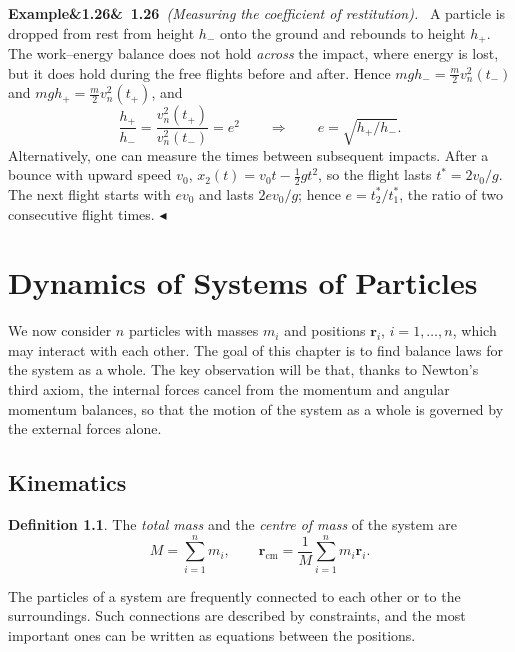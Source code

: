 \documentclass[11pt,a4paper,oneside]{report}
\numberwithin{equation}{chapter}
\newcommand{\vect}[1]{\bm{#1}}
\newcommand{\cm}{\mathrm{cm}}
\theoremstyle{plain}
\theoremstyle{definition}
\newtheorem{definition}[theorem]{Definition}
\theoremstyle{remark}
\newenvironment{example}[2]{%
  \par\addvspace{\bigskipamount}\noindent
  \textbf{Example\ifx&#1&\else~#1\fi}\ \textit{(#2).}\ \ignorespaces}%
  {\hfill$\blacktriangleleft$\par\addvspace{\bigskipamount}}
\newcommand{\lecture}[2]{\marginpar{\raggedright\footnotesize\textsc{Lecture #1}\\\textit{#2}}}
\begin{document}
\begin{example}{1.26}{Measuring the coefficient of restitution}
A particle is dropped from rest from height $h_-$ onto the ground and rebounds to height $h_+$. The work--energy
balance does not hold \emph{across} the impact, where energy is lost, but it does hold during the free flights
before and after. Hence $mgh_-=\frac m2v_n^2(t_-)$ and $mgh_+=\frac m2v_n^2(t_+)$, and
\[
  \frac{h_+}{h_-}=\frac{v_n^2(t_+)}{v_n^2(t_-)}=e^2\qquad\Longrightarrow\qquad e=\sqrt{h_+/h_-}.
\]
Alternatively, one can measure the times between subsequent impacts. After a bounce with upward speed $v_0$,
$x_2(t)=v_0t-\frac12gt^2$, so the flight lasts $t^*=2v_0/g$. The next flight starts with $ev_0$ and lasts
$2ev_0/g$; hence $e=t_2^*/t_1^*$, the ratio of two consecutive flight times.
\end{example}

\chapter{Dynamics of Systems of Particles}
\lecture{6}{05.10.2026}
We now consider $n$ particles with masses $m_i$ and positions $\vect r_i$, $i=1,\dots,n$, which may interact with
each other. The goal of this chapter is to find balance laws for the system as a whole. The key observation will be
that, thanks to Newton's third axiom, the internal forces cancel from the momentum and angular momentum balances,
so that the motion of the system as a whole is governed by the external forces alone.

\section{Kinematics}

\begin{definition}
The \emph{total mass} and the \emph{centre of mass} of the system are
\begin{equation}
  M=\sum_{i=1}^{n}m_i,\qquad\vect r_\cm=\frac1M\sum_{i=1}^{n}m_i\vect r_i .
\end{equation}
\end{definition}

The particles of a system are frequently connected to each other or to the surroundings. Such connections are
described by constraints, and the most important ones can be written as equations between the positions.
\end{document}
